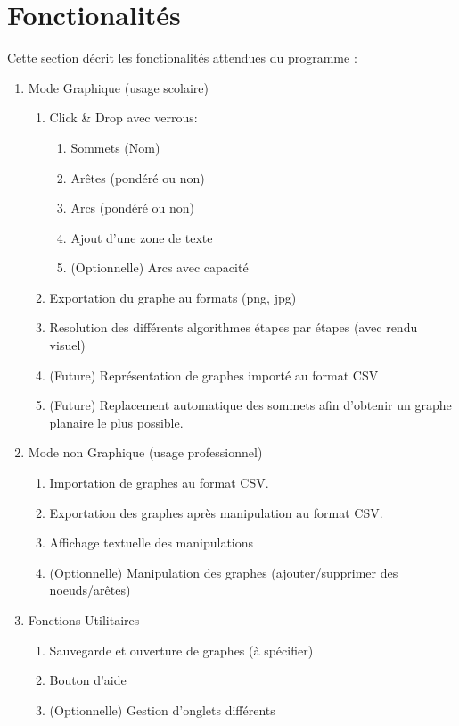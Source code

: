 \documentclass[french]{article}
\begin{document}
	\section{Fonctionalités}
    Cette section décrit les fonctionalités attendues du programme :
		\begin{enumerate}
			\item Mode Graphique (usage scolaire)
			\begin{enumerate}
        \item Click \& Drop avec verrous:
        \begin{enumerate}
          \item Sommets (Nom)
          \item Arêtes (pondéré ou non)
          \item Arcs (pondéré ou non)
          \item Ajout d'une zone de texte
          \item (Optionnelle) Arcs avec capacité
        \end{enumerate}
				\item Exportation du graphe au formats (png, jpg)
        \item Resolution des différents algorithmes étapes par étapes (avec rendu visuel)
        \item (Future) Représentation de graphes importé au format CSV
        \item (Future) Replacement automatique des sommets afin d'obtenir un graphe planaire le plus possible.
			 \end{enumerate}

		   \item Mode non Graphique (usage professionnel)
       \begin{enumerate}
 				\item Importation de graphes au format CSV.
 				\item Exportation des graphes après manipulation au format CSV.
        \item Affichage textuelle des manipulations
 				\item (Optionnelle) Manipulation des graphes (ajouter/supprimer des noeuds/arêtes)
 			\end{enumerate}

      \item Fonctions Utilitaires
			\begin{enumerate}
				\item Sauvegarde et ouverture de graphes (à spécifier)
				\item Bouton d'aide
				\item (Optionnelle) Gestion d'onglets différents
			\end{enumerate}
		\end{enumerate}
\end{document}
